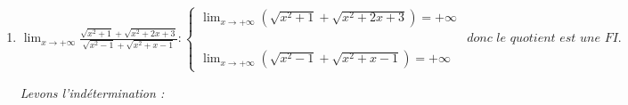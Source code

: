 \documentclass[12pt,a4paper]{article}
\begin{document}
\begin{enumerate}
    \textit{On a :}
    \begin{align*}
        \displaystyle \lim_{x \to +\infty} \frac{\sqrt{x^2 + 1} - \sqrt{4x^2 + x - 1}}{x - \sqrt{4x^2 - 1}} &= \lim_{x \to +\infty} \frac{|x|\sqrt{1 + \dfrac{1}{x^2}} - |x|\sqrt{4 + \dfrac{1}{x} - \dfrac{1}{x^2}}}{x - |x|\sqrt{4 - \dfrac{1}{x^2}}} \\
        &= \lim_{x \to +\infty} \frac{x\sqrt{1 + \dfrac{1}{x^2}} - x\sqrt{4 + \dfrac{1}{x} - \dfrac{1}{x^2}}}{x - x\sqrt{4 - \dfrac{1}{x^2}}} \quad (|x| = x \text{ car } x > 0) \\
        &= \lim_{x \to +\infty} \frac{x\left(\sqrt{1 + \dfrac{1}{x^2}} - \sqrt{4 + \dfrac{1}{x} - \dfrac{1}{x^2}}\right)}{x\left(1 - \sqrt{4 - \dfrac{1}{x^2}}\right)} \\
        &= \lim_{x \to +\infty} \frac{\sqrt{1 + \dfrac{1}{x^2}} - \sqrt{4 + \dfrac{1}{x} - \dfrac{1}{x^2}}}{1 - \sqrt{4 - \dfrac{1}{x^2}}} \\
        &= \begin{cases}
    \displaystyle \lim_{x \to +\infty} \left(\sqrt{1 + \frac{1}{x^2}} - \sqrt{4 + \frac{1}{x} - \frac{1}{x^2}}\right) = 1 - 2 = -1 \\[3mm]
    &\text{ Par quotient }\\
    \displaystyle \lim_{x \to +\infty} \left(1 - \sqrt{4 - \frac{1}{x^2}}\right) = 1 - 2 = -1
    \end{cases}
    \end{align*}
    
    \vspace{0.2cm}
    
     

    \vspace{0.6cm}

    \item 
    $
    \displaystyle \lim_{x \to +\infty} \frac{\sqrt{x^2 + 1} + \sqrt{x^2 + 2x + 3}}{\sqrt{x^2 - 1} + \sqrt{x^2 + x - 1}}:
    \begin{cases}
    \displaystyle \lim_{x \to +\infty} (\sqrt{x^2 + 1} + \sqrt{x^2 + 2x + 3}) = +\infty\\[3mm]
    &\textit{donc le quotient est une FI.}\\
    \displaystyle \lim_{x \to +\infty} (\sqrt{x^2 - 1} + \sqrt{x^2 + x - 1}) = +\infty
    \end{cases}
    $

    \textit{Levons l'indétermination :}
    

\end{enumerate}
\end{document}
